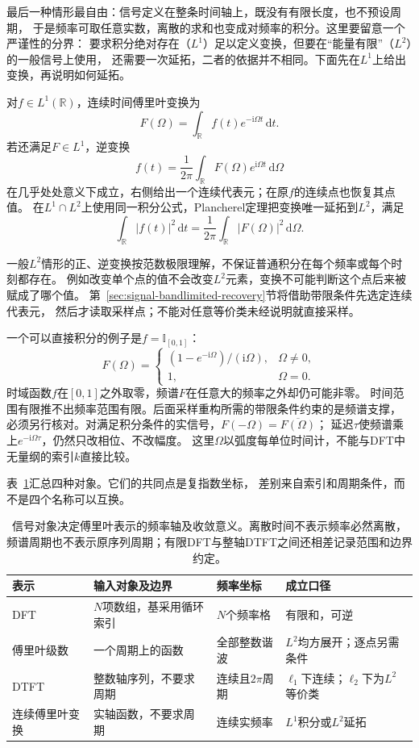 最后一种情形最自由：信号定义在整条时间轴上，既没有有限长度，也不预设周期，
于是频率可取任意实数，离散的求和也变成对频率的积分。这里要留意一个严谨性的分界：
要求积分绝对存在（$L^1$）足以定义变换，但要在“能量有限”（$L^2$）的一般信号上使用，
还需要一次延拓，二者的依据并不相同。下面先在$L^1$上给出变换，再说明如何延拓。
\begin{definition}[连续时间傅里叶变换]
  \label{def:signal-analysis-continuous-fourier-transform}
  对$f\in L^1(\mathbb R)$，连续时间傅里叶变换为
  \[
    F(\Omega)=\int_{\mathbb R}f(t)e^{-\mathrm i\Omega t}\,\mathrm dt.
  \]
  若还满足$F\in L^1$，逆变换
  \[
    f(t)=\frac1{2\pi}\int_{\mathbb R}F(\Omega)e^{\mathrm i\Omega t}\,\mathrm d\Omega
  \]
  在几乎处处意义下成立，右侧给出一个连续代表元；在原$f$的连续点也恢复其点值。
  在$L^1\cap L^2$上使用同一积分公式，Plancherel定理把变换唯一延拓到$L^2$，满足
  \[
    \int_{\mathbb R}|f(t)|^2\,\mathrm dt
    =\frac1{2\pi}\int_{\mathbb R}|F(\Omega)|^2\,\mathrm d\Omega.
  \]
\end{definition}
一般$L^2$情形的正、逆变换按范数极限理解，不保证普通积分在每个频率或每个时刻都存在。
例如改变单个点的值不会改变$L^2$元素，变换不可能判断这个点后来被赋成了哪个值。
第~\ref{sec:signal-bandlimited-recovery}节将借助带限条件先选定连续代表元，
然后才读取采样点；不能对任意等价类未经说明就直接采样。

一个可以直接积分的例子是$f=\mathbb I_{[0,1]}$：
\[
  F(\Omega)=
  \begin{cases}
    (1-e^{-\mathrm i\Omega})/(\mathrm i\Omega),&\Omega\neq0,\\
    1,&\Omega=0.
  \end{cases}
\]
时域函数$f$在$[0,1]$之外取零，频谱$F$在任意大的频率之外却仍可能非零。
时间范围有限推不出频率范围有限。后面采样重构所需的带限条件约束的是频谱支撑，
必须另行核对。对满足积分条件的实信号，$F(-\Omega)=\overline{F(\Omega)}$；
延迟$\tau$使频谱乘上$e^{-\mathrm i\Omega\tau}$，仍然只改相位、不改幅度。
这里$\Omega$以弧度每单位时间计，不能与DFT中无量纲的索引$k$直接比较。

表~\ref{tab:reader-fourier-objects}汇总四种对象。它们的共同点是复指数坐标，
差别来自索引和周期条件，而不是四个名称可以互换。
\begin{table}[htbp]
  \centering
  \begin{tabularx}{\linewidth}{lXXX}
    \toprule
    表示 & 输入对象及边界 & 频率坐标 & 成立口径\\
    \midrule
    DFT & $N$项数组，基采用循环索引 & $N$个频率格 & 有限和，可逆\\
    傅里叶级数 & 一个周期上的函数 & 全部整数谐波 & $L^2$均方展开；逐点另需条件\\
    DTFT & 整数轴序列，不要求周期 & 连续且$2\pi$周期 & $\ell_1$下连续；$\ell_2$下为$L^2$等价类\\
    连续傅里叶变换 & 实轴函数，不要求周期 & 连续实频率 & $L^1$积分或$L^2$延拓\\
    \bottomrule
  \end{tabularx}
  \caption{信号对象决定傅里叶表示的频率轴及收敛意义。离散时间不表示频率必然离散，
  频谱周期也不表示原序列周期；有限DFT与整轴DTFT之间还相差记录范围和边界约定。}
  \label{tab:reader-fourier-objects}
\end{table}

